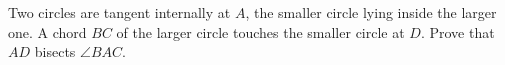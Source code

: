 Two circles are tangent internally at $A$, the smaller circle lying inside the larger one. A chord $BC$ of the larger circle touches the smaller circle at $D$. Prove that $AD$ bisects $\angle BAC$.
